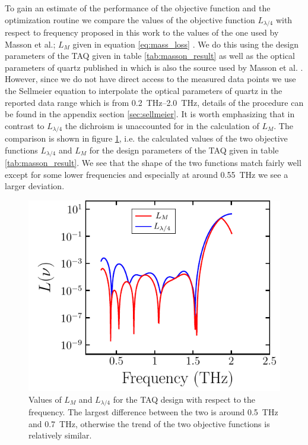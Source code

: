 To gain an estimate of the performance of the objective function and the optimization routine we compare the values of the objective function $L_{\lambda/4}$ with respect to frequency proposed in this work to the values of the one used by Masson et al.; $L_{M}$ given in equation \ref{eq:mass_loss} \cite{Masson2006}. We do this using the design parameters of the TAQ given in table \ref{tab:masson_result} as well as the optical parameters of quartz published in \cite{DGrischkowsky1990} which is also the source used by Masson et al. \cite{Masson2006}. However, since we do not have direct access to the measured data points we use the Sellmeier equation to interpolate the optical parameters of quartz in the reported data range which is from \SIrange{0.2}{2.0}{\tera \hertz}, details of the procedure can be found in the appendix section \ref{sec:sellmeier}. It is worth emphasizing that in contrast to $L_{\lambda/4}$ the dichroism is unaccounted for in the calculation of $L_{M}$. The comparison is shown in figure \ref{fig:loss_function_cl4_b}, i.e. the calculated values of the two objective functions $L_{\lambda/4}$ and $L_{M}$ for the design parameters of the TAQ given in table \ref{tab:masson_result}. We see that the shape of the two functions match fairly well except for some lower frequencies and especially at around \SI{0.55}{\tera \hertz} we see a larger deviation. 

\begin{figure}[H]
    \centering
    \includegraphics[scale=0.78]{images/results/plots/ceramic/loss_function_b.pdf}
    \caption{Values of $L_M$ and $L_{\lambda/4}$ for the TAQ design with respect to the frequency. The largest difference between the two is around \SI{0.5}{\tera \hertz} and \SI{0.7}{\tera \hertz}, otherwise the trend of the two objective functions is relatively similar.}
    \label{fig:loss_function_cl4_b}
\end{figure}


